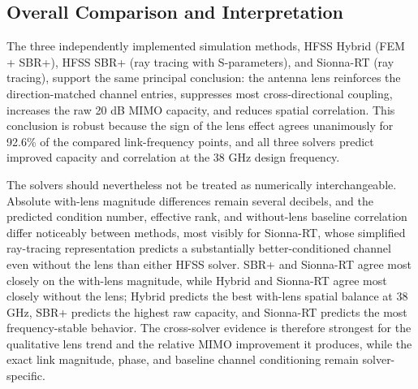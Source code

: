 \subsection{Overall Comparison and Interpretation}
The three independently implemented simulation methods, HFSS Hybrid (FEM + SBR+), HFSS SBR+ (ray tracing with S-parameters), and Sionna-RT (ray tracing), support the same principal conclusion: the antenna lens reinforces the direction-matched channel entries, suppresses most cross-directional coupling, increases the raw 20 dB MIMO capacity, and reduces spatial correlation. This conclusion is robust because the sign of the lens effect agrees unanimously for 92.6\% of the compared link-frequency points, and all three solvers predict improved capacity and correlation at the 38 GHz design frequency.

The solvers should nevertheless not be treated as numerically interchangeable. Absolute with-lens magnitude differences remain several decibels, and the predicted condition number, effective rank, and without-lens baseline correlation differ noticeably between methods, most visibly for Sionna-RT, whose simplified ray-tracing representation predicts a substantially better-conditioned channel even without the lens than either HFSS solver. SBR+ and Sionna-RT agree most closely on the with-lens magnitude, while Hybrid and Sionna-RT agree most closely without the lens; Hybrid predicts the best with-lens spatial balance at 38 GHz, SBR+ predicts the highest raw capacity, and Sionna-RT predicts the most frequency-stable behavior. The cross-solver evidence is therefore strongest for the qualitative lens trend and the relative MIMO improvement it produces, while the exact link magnitude, phase, and baseline channel conditioning remain solver-specific.

